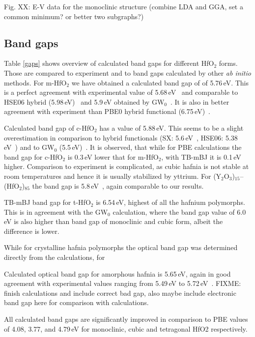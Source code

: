 \documentclass[10pt,a4paper,twocolumn]{article}
\begin{document}
Fig. XX: E-V data for the monoclinic structure (combine LDA and GGA, set a common minimum? or better two subgraphs?)


\subsection{Band gaps}

Table \ref{gaps} shows overview of calculated band gaps for different HfO$_2$ forms.
Those are compared to experiment and to band gaps calculated by other \textit{ab initio} methods.
For m-HfO$_2$ we have obtained a calculated band gap of of 5.76\,eV.
This is a perfect agreement with experimental value of 5.68\,eV~\cite{Balog1977} and comparable to HSE06 hybrid (5.98\,eV)~\cite{Komsa2010} and 5.9\,eV obtained by GW$_0$~\cite{Gruning2010}.
It is also in better agreement with experiment than PBE0 hybrid functional (6.75\,eV)~\cite{Komsa2010}.

Calculated band gap of c-HfO$_2$ has a value of 5.88\,eV.
This seems to be a slight overestimation in comparison to hybrid functionals (SX: 5.6\,eV~\cite{Clark2010}, HSE06: 5.38\,eV~\cite{Yang2014}) and to GW$_0$ (5.5\,eV)~\cite{Gruning2010}.
It is observed, that while for PBE calculations the band gap for c-HfO$_2$ is 0.3\,eV lower that for m-HfO$_2$, with TB-mBJ it is 0.1\,eV higher.
Comparison to experiment is complicated, as cubic hafnia is not stable at room temperatures and hence it is usually stabilized by yttrium.
For (Y$_2$O$_3$)$_{15}$--(HfO$_2$)$_{85}$ the band gap is 5.8\,eV~\cite{Lim2002}, again comparable to our results.

TB-mBJ band gap for t-HfO$_2$ is 6.54\,eV, highest of all the hafnium polymorphs.
This is in agreement with the GW$_0$ calculation, where the band gap value of 6.0\,eV is also higher than band gap of monoclinic and cubic form, albeit the difference is lower.

While for crystalline hafnia polymorphs the optical band gap was determined directly from the calculations, for 

Calculated optical band gap for amorphous hafnia is 5.65\,eV, again in good agreement with experimental values ranging from 5.49\,eV to 5.72\,eV~\cite{Takeuchi2004, Nguyen2005}.
FIXME: finish calculations and include correct bad gap, also maybe include electronic band gap here for comparison with calculations.

All calculated band gaps are significantly improved in comparison to PBE values of 4.08, 3.77, and 4.79\,eV for monoclinic, cubic and tetragonal HfO2 respectively.
 
\end{document}
